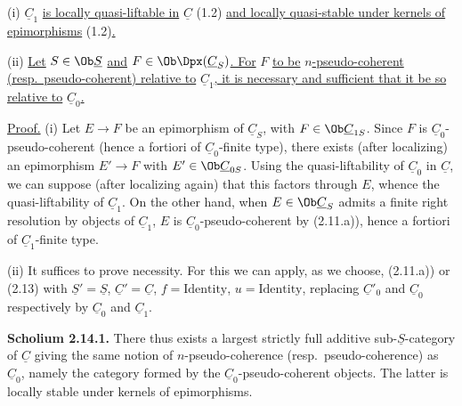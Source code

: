(i) \(\underline{C}_1\) \uline{is locally quasi-liftable in} \(\underline{C}\) (1.2) \uline{and locally quasi-stable under kernels of epimorphisms} (1.2)\uline{.}

(ii) \uline{Let} \(S\in\Ob \underline{S}\) \uline{and} \(F\in\Ob\Dpx(\underline{C}_S)\)\uline{. For} \(F\) \uline{to be} \(n\)\uline{-pseudo-coherent (resp.\ pseudo-coherent) relative to} \(\underline{C}_1\)\uline{, it is necessary and sufficient that it be so relative to} \(\underline{C}_0\)\uline{.}

\uline{Proof.} (i) Let \(E\to F\) be an epimorphism of \(\underline{C}_S\), with \(F\in\Ob\underline{C}_{1S}\). Since \(F\) is \(\underline{C}_0\)-pseudo-coherent (hence a fortiori of \(\underline{C}_0\)-finite type), there exists (after localizing) an epimorphism \(E'\to F\) with \(E'\in\Ob\underline{C}_{0S}\). Using the quasi-liftability of \(\underline{C}_0\) in \(\underline{C}\), we can suppose (after localizing again) that this factors through \(E\), whence the quasi-liftability of \(\underline{C}_1\). On the other hand, when \(E\in\Ob\underline{C}_S\) admits a finite right resolution by objects of \(\underline{C}_1\), \(E\) is \(\underline{C}_0\)-pseudo-coherent by (2.11.a)), hence a fortiori of \(\underline{C}_1\)-finite type.

(ii) It suffices to prove necessity. For this we can apply, as we choose, (2.11.a)) or (2.13) with \(\underline{S}'=\underline{S}\), \(\underline{C}'=\underline{C}\), \(f=\text{Identity}\), \(u=\text{Identity}\), replacing \(\underline{C}'_0\) and \(\underline{C}_0\) respectively by \(\underline{C}_0\) and \(\underline{C}_1\).

\textbf{Scholium 2.14.1.} There thus exists a largest strictly full additive sub-\(\underline{S}\)-category of \(\underline{C}\) giving the same notion of \(n\)-pseudo-coherence (resp.\ pseudo-coherence) as \(\underline{C}_0\), namely the category formed by the \(\underline{C}_0\)-pseudo-coherent objects. The latter is locally stable under kernels of epimorphisms.

